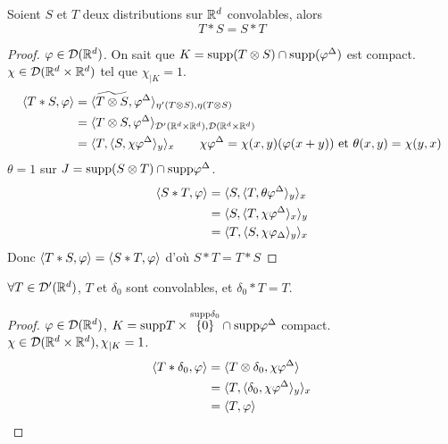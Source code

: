 \documentclass[]{report}
\begin{document}
    \begin{prop}{}{}
        Soient $S$ et $T$ deux distributions sur $\mathbb{R}^d$ convolables, alors
        \[T*S=S*T\]
    \end{prop}

    \begin{proof}
        $\varphi\in \mathcal{D}(\mathbb{R}^d)$. On sait que $K=\text{supp}(T\otimes S)\cap \text{supp} (\varphi^\Delta)$ est compact.\\
        $\chi \in \mathcal{D}(\mathbb{R}^d\times \mathbb{R}^d)$ tel que $\chi_{|K}=1$.
        \begin{align*}
            \langle T*S,\varphi \rangle&=\langle \widetilde{T\otimes S},\varphi^\Delta \rangle_{\eta'(T\otimes S),\eta(T\otimes S)}\\
            &=\langle T\otimes S,\varphi^\Delta \rangle_{\mathcal{D}'(\mathbb{R}^d\times \mathbb{R}^d),\mathcal{D}(\mathbb{R}^d\times \mathbb{R}^d)}\\
            &=\langle T,\langle S,\chi \varphi^\Delta \rangle_y \rangle_x\qquad \chi \varphi^\Delta=\chi(x,y)(\varphi(x+y))\text{ et } \theta(x,y)=\chi(y,x)
        \end{align*}
        $\theta=1$ sur $J=\text{supp}(S\otimes T)\cap \text{supp} \varphi^\Delta$.
        \begin{align*}
            \langle S*T,\varphi \rangle&=\langle S,\langle T,\theta \varphi^\Delta \rangle_y \rangle_x\\
            &=\langle S,\langle T,\chi\varphi^\Delta \rangle_x \rangle_y\\
            &=\langle T,\langle S,\chi\varphi_\Delta \rangle_y \rangle_x
        \end{align*}
        Donc $\langle T*S,\varphi \rangle=\langle S*T,\varphi \rangle$ d'où $S*T=T*S$
    \end{proof}

    \begin{prop}{}{}
        $\forall T\in \mathcal{D}'(\mathbb{R}^d)$, $T$ et $\delta_0$ sont convolables, et $\delta_0*T=T$.
    \end{prop}

    \begin{proof}
        $\varphi\in \mathcal{D}(\mathbb{R}^d)$, $K=\text{supp} T\times \overset{\text{supp} \delta_0}{\{0\}}\cap \text{supp} \varphi^\Delta$ compact.\\
        $\chi\in \mathcal{D}(\mathbb{R}^d\times \mathbb{R}^d),\chi_{|K}=1$.
        \begin{align*}
            \langle T*\delta_0,\varphi \rangle&=\langle T\otimes\delta_0,\chi\varphi^\Delta \rangle\\
            &=\langle T,\langle \delta_0,\chi\varphi^\Delta \rangle_y \rangle_x\\
            &=\langle T,\varphi \rangle
        \end{align*}
    \end{proof}
\end{document}

